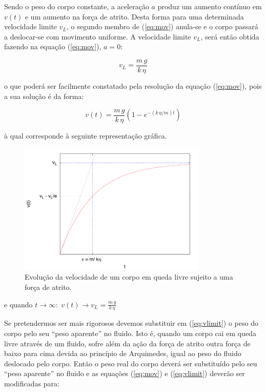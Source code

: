 \documentclass[a4paper,twoside,12pt]{article}      %
\begin{document}
Sendo o peso do corpo constante, a aceleração $a$ produz um aumento contínuo em $v(t)$ e um aumento na força de atrito. Desta forma para uma determinada velocidade limite $v_L$, o segundo membro de (\ref{eq:mov}) anula-se e o corpo passará a deslocar-se com movimento uniforme. A velocidade limite $v_L$, será então obtida fazendo na equação (\ref{eq:mov}), $a= 0$:

\begin{equation}
	\label{eq:vlimit}
	v_L = \frac{m\,g}{k  \, \eta}
\end{equation}

o que poderá ser facilmente constatado pela resolução da equação (\ref{eq:mov}), pois a sua solução é da forma:

\begin{equation}
	\label{eq:vlimita}
	v(t) = \frac{m\,g}{k  \, \eta} (1 - e^{- (k\,\eta / m) t})
\end{equation}

à qual corresponde à seguinte representação gráfica.


\begin{figure}
	[tb]  \centering 
	\includegraphics[width=0.8\textwidth]{./plote}
	\caption{ Evolução da velocidade de um corpo em queda livre sujeito a uma força de atrito. \label{fig:vLim}} 
\end{figure}


e quando $t \to \infty :\; v(t) \to v_L = \frac{m\,g}{k  \, \eta} $

Se pretendermos ser mais rigorosos devemos substituir  em (\ref{eq:vlimit}) o peso do corpo pelo seu “peso aparente” no fluido. Isto é, quando um corpo cai em queda livre através de um fluido, sofre além da ação da força de atrito outra força de baixo para cima devida ao princípio de Arquimedes, igual ao peso do fluido deslocado pelo corpo. Então o peso real do corpo deverá ser substituído pelo seu “peso aparente” no fluido e as equações (\ref{eq:mov}) e (\ref{eq:vlimit}) deverão ser modificadas para:
\end{document}

